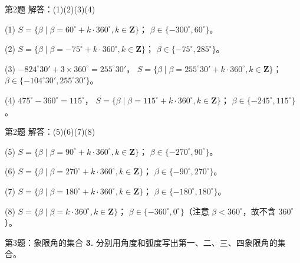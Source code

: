 \documentclass[10pt,aspectratio=169,serif]{beamer}
\begin{document}
\begin{frame}[t]{第2题 解答：(1)(2)(3)(4)}
\begin{tcolorbox}[colback=orange!10,colframe=orange,title=\textbf{解}]
\small
(1) $S=\{\beta\mid\beta=60^\circ+k\cdot 360^\circ,k\in\mathbf{Z}\}$；
$\beta\in\{-300^\circ,60^\circ\}$。

(2) $S=\{\beta\mid\beta=-75^\circ+k\cdot 360^\circ,k\in\mathbf{Z}\}$；
$\beta\in\{-75^\circ,285^\circ\}$。

(3) $-824^\circ 30' + 3\times 360^\circ = 255^\circ 30'$，
$S=\{\beta\mid\beta=255^\circ 30'+k\cdot 360^\circ,k\in\mathbf{Z}\}$；
$\beta\in\{-104^\circ 30',255^\circ 30'\}$。

(4) $475^\circ - 360^\circ = 115^\circ$，
$S=\{\beta\mid\beta=115^\circ+k\cdot 360^\circ,k\in\mathbf{Z}\}$；
$\beta\in\{-245^\circ,115^\circ\}$。
\end{tcolorbox}
\end{frame}

\begin{frame}[t]{第2题 解答：(5)(6)(7)(8)}
\begin{tcolorbox}[colback=orange!10,colframe=orange,title=\textbf{解}]
(5) $S=\{\beta\mid\beta=90^\circ+k\cdot 360^\circ,k\in\mathbf{Z}\}$；
$\beta\in\{-270^\circ,90^\circ\}$。

(6) $S=\{\beta\mid\beta=270^\circ+k\cdot 360^\circ,k\in\mathbf{Z}\}$；
$\beta\in\{-90^\circ,270^\circ\}$。

(7) $S=\{\beta\mid\beta=180^\circ+k\cdot 360^\circ,k\in\mathbf{Z}\}$；
$\beta\in\{-180^\circ,180^\circ\}$。

(8) $S=\{\beta\mid\beta=k\cdot 360^\circ,k\in\mathbf{Z}\}$；
$\beta\in\{-360^\circ,0^\circ\}$（注意 $\beta<360^\circ$，故不含 $360^\circ$）。
\end{tcolorbox}
\end{frame}

\begin{frame}[t]{第3题：象限角的集合}
\textbf{3.} 分别用角度和弧度写出第一、二、三、四象限角的集合。
\end{frame}
\end{document}
